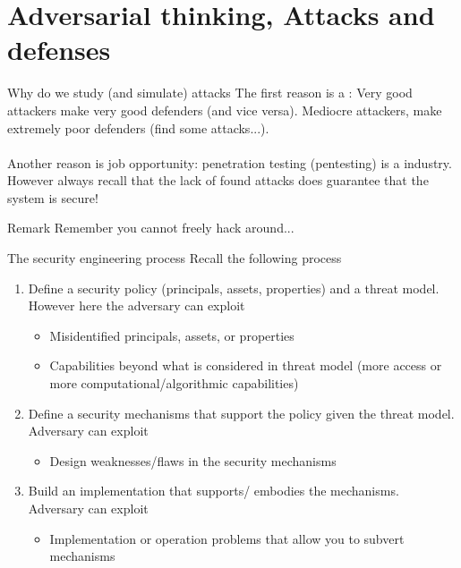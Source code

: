 \section{Adversarial thinking, Attacks and defenses}

\begin{parag}{Why do we study (and simulate) attacks}
	The first reason is a : Very good attackers make very good defenders (and vice versa). Mediocre attackers, make extremely poor defenders (find some attacks...).\\ 
	$ $\\
    Another reason is job opportunity: penetration testing (pentesting) is a  industry. However always recall that the lack of found attacks does  guarantee that the system is secure!
	\begin{subparag}{Remark}
	    Remember you cannot freely hack around...
	\end{subparag}
\end{parag}

\begin{parag}{The security engineering process}
	Recall the following process
    \begin{enumerate}
        \item Define a security policy (principals, assets, properties) and a threat model. However here the adversary can exploit
			\begin{itemize}
			    \item Misidentified principals, assets, or properties
			    \item Capabilities beyond what is considered in threat model (more access or more computational/algorithmic capabilities)
			\end{itemize}
        \item Define a security mechanisms that support the policy given the threat model. Adversary can exploit 
			\begin{itemize}
			    \item Design weaknesses/flaws in the security mechanisms
			\end{itemize}
			
        \item Build an implementation that supports/ embodies the mechanisms. Adversary can exploit
			\begin{itemize}
			    \item Implementation or operation problems that allow you to subvert mechanisms
			\end{itemize}
			
    \end{enumerate}
    
\end{parag}


